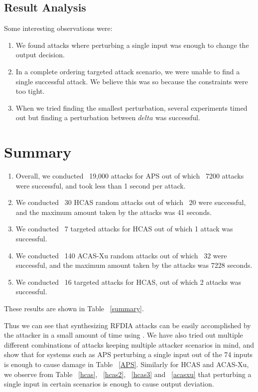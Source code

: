 \subsection{Result Analysis}
Some interesting observations were:
\begin{enumerate}
	\item We found attacks where perturbing a single input was enough to change the output decision.  
	\item In a complete ordering targeted attack scenario, we were unable to find a single successful attack. We believe this was so because the constraints were too tight. 
	\item When we tried finding the smallest perturbation, several experiments timed out but finding a perturbation between $delta$ was successful. 
\end{enumerate}	


\section{Summary}
\begin{enumerate}
	\item Overall, we conducted ~19,000 attacks for \ac{APS} out of which ~7200 attacks were successful, and took less than 1 second per attack. 
	\item We conducted ~30 \ac{HCAS} random attacks out of which ~20 were successful, and the maximum amount taken by the attacks was 41 seconds.
	\item We conducted ~7 targeted attacks for \ac{HCAS} out of which 1 attack was successful.
	\item We conducted ~140 \ac{ACAS-Xu} random attacks out of which ~32 were successful, and the maximum amount taken by the attacks was 7228 seconds.
	\item We conducted ~16 targeted attacks for \ac{HCAS}, out of which 2 attacks was successful.
\end{enumerate}

 
These results are shown in Table ~\ref{summary}.

Thus we can see that synthesizing \ac{RFDIA} attacks can be easily accomplished by the attacker in a small amount of time using \tool. 
We have also tried out multiple different combinations of attacks keeping multiple attacker scenarios in mind, and show that for systems such as \ac{APS} perturbing a single input out of the 74 inputs is enough to cause damage in Table ~\ref{APS}.
Similarly for \ac{HCAS} and \ac{ACAS-Xu}, we observe  from Table ~\ref{hcas}, ~\ref{hcas2}, ~\ref{hcas3} and ~\ref{acasxu} that perturbing a single input in certain scenarios is enough to cause output deviation. 

